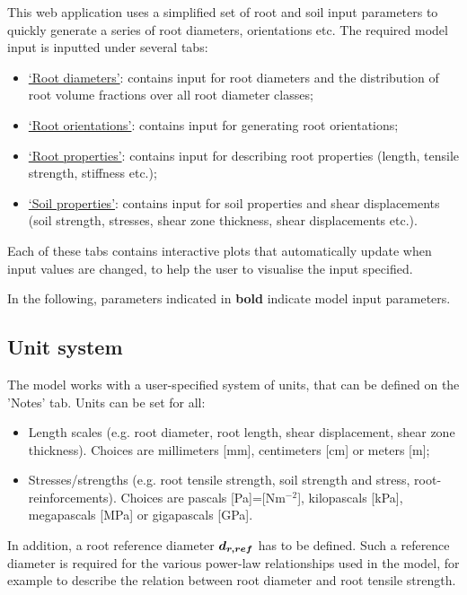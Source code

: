 \documentclass[a4 paper, 11  pt]{article}
\begin{document}
This web application uses a simplified set of root and soil input parameters to quickly generate a series of root diameters, orientations etc. The required model input is inputted under several tabs:
\begin{itemize}
	\parskip=1pt
	\itemsep=0pt
	\item \hyperref[sec:inputrootdiameters]{`Root diameters'}: contains input for root diameters and the distribution of root volume fractions over all root diameter classes;
	\item \hyperref[seq:rootorientations]{`Root orientations'}: contains input for generating root orientations;
	\item \hyperref[sec:inputrootproperties]{`Root properties'}: contains input for describing root properties (length, tensile strength, stiffness etc.);
	\item \hyperref[sec:soilproperties]{`Soil properties'}: contains input for soil properties and shear displacements (soil strength, stresses, shear zone thickness, shear displacements etc.).
\end{itemize}
Each of these tabs contains interactive plots \citep[generated using Plotly][]{plotly} that automatically update when input values are changed, to help the user to visualise the input specified. 

In the following, parameters indicated in \textbf{bold} indicate model input parameters.

\subsection{Unit system}

The model works with a user-specified system of units, that can be defined on the 'Notes' tab. Units can be set for all:
\begin{itemize}
	\parskip=1pt
	\itemsep=0pt
	\item Length scales (e.g. root diameter, root length, shear displacement, shear zone thickness). Choices are millimeters [mm], centimeters [cm] or meters [m];
	\item Stresses/strengths (e.g. root tensile strength, soil strength and stress, root-reinforcements). Choices are pascals [Pa]=[Nm$^{-2}$], kilopascals [kPa], megapascals [MPa] or gigapascals [GPa].
\end{itemize}
In addition, a root reference diameter $\vb*{d_{r,ref}}$ has to be defined. Such a reference diameter is required for the various power-law relationships used in the model, for example to describe the relation between root diameter and root tensile strength.
\end{document}
